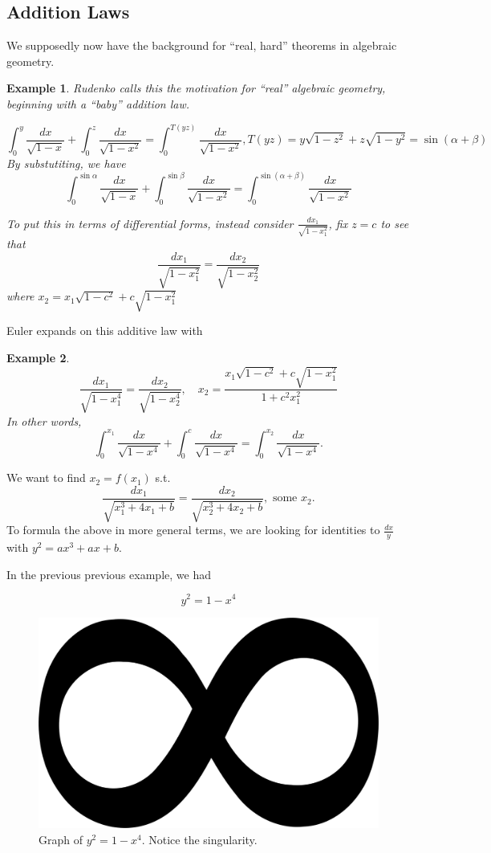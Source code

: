 \documentclass[12pt]{article}
\newtheorem*{example}{Example}
\begin{document}
\subsection{Addition Laws}

We supposedly now have the background for ``real, hard'' theorems in algebraic geometry.

\begin{example}
Rudenko calls this the motivation for ``real'' algebraic geometry, beginning with a ``baby'' addition law.

\[
	\int_0^y \frac{dx}{\sqrt{1-x}}+\int_0^z \frac{dx}{\sqrt{1-x^2}}=\int_0^{T(y z)} \frac{dx}{\sqrt{1-x^2}}, T(y z)=y \sqrt{1-z^2}+z \sqrt{1-y^2}=\sin (\alpha+\beta)
\]
By substutiting, we have
\[
\int_0^{\sin \alpha} \frac{dx}{\sqrt{1-x}}+\int_0^{\sin \beta} \frac{dx}{\sqrt{1-x^2}}=\int_0^{\sin (\alpha+\beta)} \frac{dx}{\sqrt{1-x^2}}
\]

To put this in terms of differential forms, instead consider $\frac{d x_1}{\sqrt{1-x_1^2}}$, fix $z=c$ to see that
\[
	\frac{dx_1}{\sqrt{1-x_1^2}}=\frac{dx_2}{\sqrt{1-x_2^2}}
\]
where $x_2=x_1 \sqrt{1-c^2}+c \sqrt{1-x_1^2}$
\end{example}

Euler expands on this additive law with
\begin{example}
\[
	\frac{dx_1}{\sqrt{1-x_1^4}}=\frac{dx_2}{\sqrt{1-x_2^4}}, \quad x_2=\frac{x_1 \sqrt{1-c^2}+c\sqrt{1-x_1^2}}{1+c^2 x_1^2}
\]
In other words,
\[
	\int_0^{x_1} \frac{d x}{\sqrt{1-x^4}}+\int_0^c \frac{d x}{\sqrt{1-x^4}}=\int_0^{x_2} \frac{d x}{\sqrt{1-x^4}}
.\]
\end{example}

We want to find $x_{2} = f(x_{1})$ s.t.
\[
	\frac{d x_1}{\sqrt{x_1^3+4 x_1+b}}=\frac{d x_2}{\sqrt{x_2^3+4 x_2+b}}, \text { some } x_2
.\]
To formula the above in more general terms, we are looking for identities to $\frac{dx}{y} $ with $y^2=ax^3 +ax+b $.

In the previous previous example, we had

\[
y^2=1-x^4
\]

\begin{figure}
	\centering
	\includegraphics[width=.3\textwidth]{infinity}
	\caption{Graph of $y^2=1-x^4 $. Notice the singularity.}
\end{figure}
\end{document}
